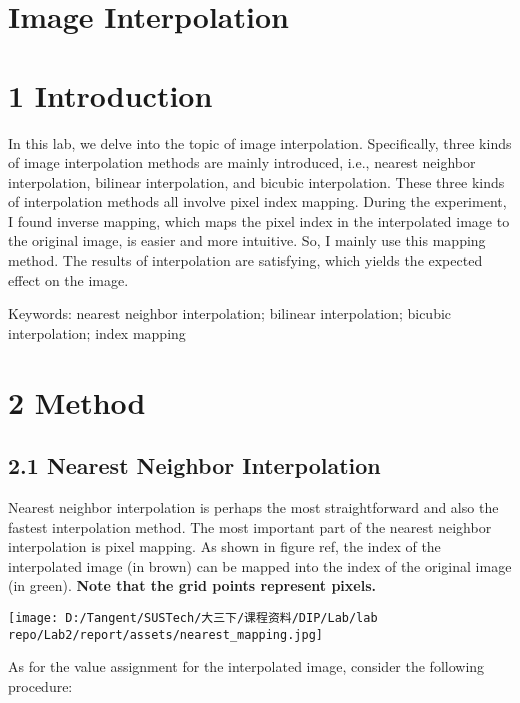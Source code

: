 \documentclass[
]{article}
\author{}
\date{}
\begin{document}
\hypertarget{image-interpolation}{%
\section{Image Interpolation}\label{image-interpolation}}

\hypertarget{1-introduction}{%
\section{1 Introduction}\label{1-introduction}}

In this lab, we delve into the topic of image interpolation.
Specifically, three kinds of image interpolation methods are mainly
introduced, i.e., nearest neighbor interpolation, bilinear
interpolation, and bicubic interpolation. These three kinds of
interpolation methods all involve pixel index mapping. During the
experiment, I found inverse mapping, which maps the pixel index in the
interpolated image to the original image, is easier and more intuitive.
So, I mainly use this mapping method. The results of interpolation are
satisfying, which yields the expected effect on the image.

Keywords: nearest neighbor interpolation; bilinear interpolation;
bicubic interpolation; index mapping

\hypertarget{2-method}{%
\section{2 Method}\label{2-method}}

\hypertarget{21-nearest-neighbor-interpolation}{%
\subsection{2.1 Nearest Neighbor
Interpolation}\label{21-nearest-neighbor-interpolation}}

Nearest neighbor interpolation is perhaps the most straightforward and
also the fastest interpolation method. The most important part of the
nearest neighbor interpolation is pixel mapping. As shown in figure ref,
the index of the interpolated image (in brown) can be mapped into the
index of the original image (in green). \textbf{Note that the grid
points represent pixels.}

\texttt{[image: D:/Tangent/SUSTech/大三下/课程资料/DIP/Lab/lab repo/Lab2/report/assets/nearest\_mapping.jpg]}

As for the value assignment for the interpolated image, consider the
following procedure:
\end{document}
